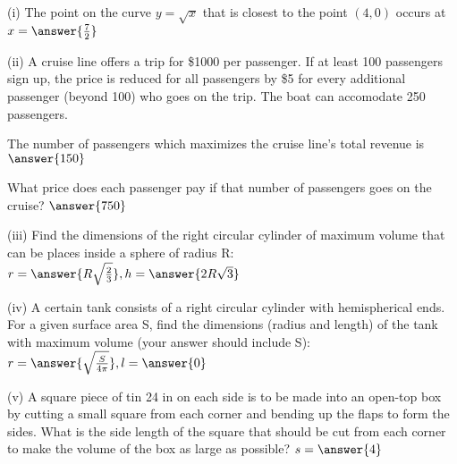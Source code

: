 \documentclass{ximera}
\begin{document}
\begin{exercise}
(i) The point on the curve $y=\sqrt{x}$ that is closest to the point $(4,0)$ occurs at $x=\answer{\frac{7}{2}}$

(ii) A cruise line offers a trip for \$1000 per passenger. If at least 100 passengers sign up, the price is reduced for all passengers by \$5 for every additional passenger (beyond 100) who goes on the trip.  The boat can accomodate 250 passengers.

The number of passengers which maximizes the cruise line's total revenue is $\answer{150}$

What price does each passenger pay if that number of passengers goes on the cruise? $\answer{750}$

(iii) Find the dimensions of the right circular cylinder of maximum volume that can be places inside a sphere of radius R: $r=\answer{R\sqrt{\frac{2}{3}}}, h=\answer{2R\sqrt{3}}$

(iv) A certain tank consists of a right circular cylinder with hemispherical ends. For a given surface area S, find the dimensions (radius and length) of the tank with maximum volume (your answer should include S): $r=\answer{\sqrt{\frac{S}{4\pi}}}, l=\answer{0}$

(v) A square piece of tin 24 in on each side is to be made into an open-top box by cutting a small square from each corner and bending up the flaps to form the sides.  What is the side length of the square that should be cut from each corner to make the volume of the box as large as possible? $s=\answer{4}$
\end{exercise}
\end{document}
